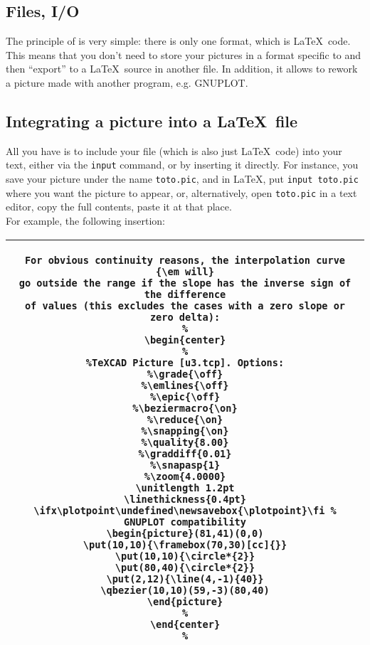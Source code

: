 \documentclass[11pt,a4paper]{article}
\begin{document}
\subsection{Files, I/O} The principle of {\TC} is very simple:
there is only one format, which is \LaTeX\, code.
This means that you don't need to store your pictures in
a format specific to {\TC} and then ``export'' to a \LaTeX\, source in
another file. In addition, it allows to rework a picture made with
another program, e.g. GNUPLOT.

\subsection{Integrating a {\TC} picture into a \LaTeX\, file}
\label{insert}
All you have is to include your {\TC} file (which is also just \LaTeX\, code)
into your text, either via the {\tt \bs input} command, or by inserting
it directly.
%
For instance, you save your picture under the name {\tt toto.pic},
and in \LaTeX, put {\tt \bs input toto.pic} where you want the picture
to appear, or, alternatively, open {\tt toto.pic} in a text editor, copy
the full contents, paste it at that place.\\
For example, the following insertion:
\\
\begin{center}
\begin{tabular}{|c|}
\hline
{\tiny
\begin{minipage}[t]{0.7\linewidth}
\begin{verbatim}
For obvious continuity reasons, the interpolation curve {\em will}
go outside the range if the slope has the inverse sign of the difference
of values (this excludes the cases with a zero slope or zero delta):
%
\begin{center}
%
%TeXCAD Picture [u3.tcp]. Options:
%\grade{\off}
%\emlines{\off}
%\epic{\off}
%\beziermacro{\on}
%\reduce{\on}
%\snapping{\on}
%\quality{8.00}
%\graddiff{0.01}
%\snapasp{1}
%\zoom{4.0000}
\unitlength 1.2pt
\linethickness{0.4pt}
\ifx\plotpoint\undefined\newsavebox{\plotpoint}\fi % GNUPLOT compatibility
\begin{picture}(81,41)(0,0)
\put(10,10){\framebox(70,30)[cc]{}}
\put(10,10){\circle*{2}}
\put(80,40){\circle*{2}}
\put(2,12){\line(4,-1){40}}
\qbezier(10,10)(59,-3)(80,40)
\end{picture}
%
\end{center}
%
\end{verbatim}
\end{minipage}
}\\
\hline
\end{tabular}
\end{center}
\end{document}
